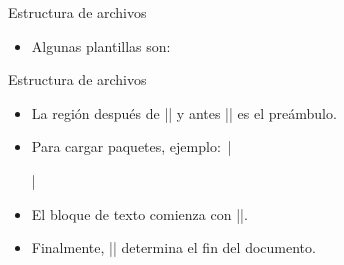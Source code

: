 \begin{frame}[fragile]{Estructura de archivos}
  \begin{itemize}
  \begin{latexcode}
\end{latexcode}
    \item Algunas plantillas son:
     \setlength{\multicolsep}{0pt}
          \setlength{\columnsep}{0pt}
          \begin{multicols}{3}
            \begin{itemize}
              \item \texttt{article} 
              \item \texttt{book}
              \item \texttt{report}
              \item \texttt{letter}
              \item \texttt{beamer} }
              \item[]
            \end{itemize}
          \end{multicols}
  \end{itemize}
\end{frame}
\begin{frame}[fragile]{Estructura de archivos}
  \begin{itemize}
    \item La región después de \latexinline|\documentclas| y antes \latexinline|| es el \alert{preámbulo}.
    \item Para cargar paquetes, ejemplo:~\latexinline|\usepackage{amsmath}|
    \item El bloque de texto comienza con \latexinline||.
    \item Finalmente, \latexinline|| determina el fin del documento.
  \end{itemize}
\end{frame}
